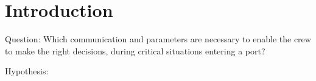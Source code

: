 \chapter*{Introduction}

Question: Which communication and parameters are necessary to enable the crew to make the right decisions, during critical situations entering a port?

Hypothesis:
